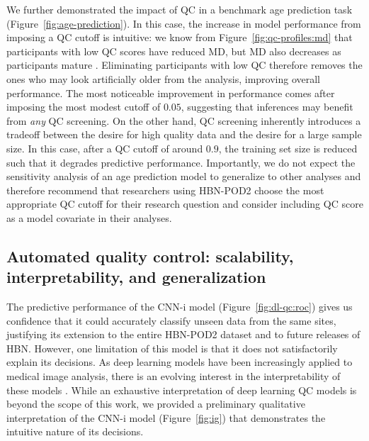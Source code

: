 \documentclass[fleqn,10pt,inline]{wlscirep}
\begin{document}
We further demonstrated the impact of QC in a benchmark age prediction task
(Figure~\ref{fig:age-prediction}). In this case, the increase in model performance
from imposing a QC cutoff is intuitive: we know from
Figure~\ref{fig:qc-profiles:md} that participants with low QC scores have
reduced MD, but MD also decreases as participants mature
\cite{yeatman2014lifespan,richie-halford2021multidimensional}. Eliminating
participants with low QC therefore removes the ones who may look artificially older
from the analysis, improving overall performance. The most noticeable
improvement in performance comes after imposing the most modest cutoff of
$0.05$, suggesting that inferences may benefit from \emph{any} QC screening. On
the other hand, QC screening inherently introduces a tradeoff between the desire
for high quality data and the desire for a large sample size. In this case,
after a QC cutoff of around $0.9$, the training set size is reduced such that it
degrades predictive performance. Importantly, we do not expect the sensitivity
analysis of an age prediction model to generalize to other analyses and therefore
recommend that researchers using HBN-POD2 choose the most appropriate QC cutoff for their research question and consider including QC score as a model covariate in their analyses.

\subsection*{Automated quality control: scalability, interpretability, and generalization}

The predictive
performance of the CNN-i model (Figure~\ref{fig:dl-qc:roc}) gives
us confidence that it could accurately classify unseen data from the same sites, justifying its
extension to the entire HBN-POD2 dataset and to future releases of HBN. However, one limitation of this model is that it
does not satisfactorily explain its decisions. As deep learning models have been increasingly
applied to medical image analysis, there is an evolving interest in the
interpretability of these models \cite{salahuddin2022transparency, lipton2017doctor,
Zech2018-ki, Ghassemi2021-zg}. While an
exhaustive interpretation of deep learning QC models is beyond the scope of this
work, we provided a preliminary qualitative interpretation of the CNN-i model
(Figure~\ref{fig:ig}) that demonstrates the intuitive nature of its decisions. 
\end{document}
